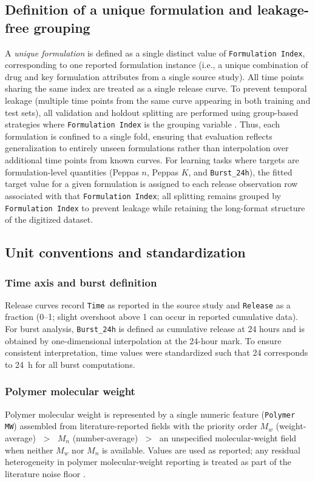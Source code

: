 \documentclass[preprint,12pt,authoryear]{elsarticle}
\begin{document}
\subsection{Definition of a unique formulation and leakage-free grouping}
\label{subsec:formulation_index}
A \textit{unique formulation} is defined as a single distinct value of \texttt{Formulation Index}, corresponding to one reported formulation instance (i.e., a unique combination of drug and key formulation attributes from a single source study). All time points sharing the same index are treated as a single release curve. To prevent temporal leakage (multiple time points from the same curve appearing in both training and test sets), all validation and holdout splitting are performed using group-based strategies where \texttt{Formulation Index} is the grouping variable \citep{Roberts2017CVStructure}. Thus, each formulation is confined to a single fold, ensuring that evaluation reflects generalization to entirely unseen formulations rather than interpolation over additional time points from known curves. For learning tasks where targets are formulation-level quantities (Peppas $n$, Peppas $K$, and \texttt{Burst\_24h}), the fitted target value for a given formulation is assigned to each release observation row associated with that \texttt{Formulation Index}; all splitting remains grouped by \texttt{Formulation Index} to prevent leakage while retaining the long-format structure of the digitized dataset.

\subsection{Unit conventions and standardization}
\label{subsec:units}
\subsubsection{Time axis and burst definition}
Release curves record \texttt{Time} as reported in the source study and \texttt{Release} as a fraction (0--1; slight overshoot above 1 can occur in reported cumulative data). For burst analysis, \texttt{Burst\_24h} is defined as cumulative release at 24 hours and is obtained by one-dimensional interpolation at the 24-hour mark. To ensure consistent interpretation, time values were standardized such that 24 corresponds to 24~h for all burst computations.

\subsubsection{Polymer molecular weight}
Polymer molecular weight is represented by a single numeric feature (\texttt{Polymer MW}) assembled from literature-reported fields with the priority order $M_w$ (weight-average) $\;>\;$ $M_n$ (number-average) $\;>\;$ an unspecified molecular-weight field when neither $M_w$ nor $M_n$ is available. Values are used as reported; any residual heterogeneity in polymer molecular-weight reporting is treated as part of the literature noise floor \citep{Fredenberg2011,MakadiaSiegel2011,Jain2000}.
\end{document}
